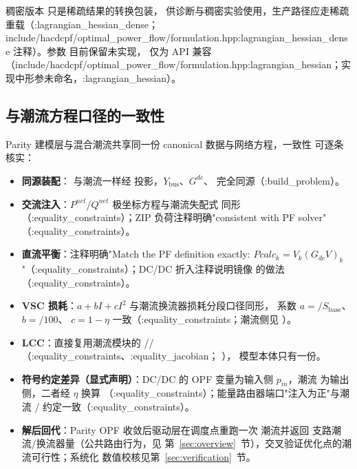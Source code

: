 稠密版本  只是稀疏结果的转换包装，
供诊断与稠密实验使用，生产路径应走稀疏重载（:lagrangian\_hessian\_dense；
include/hacdcpf/optimal\_power\_flow/formulation.hpp:lagrangian\_hessian\_dense 注释）。参数  目前保留未实现，
仅为 API 兼容（include/hacdcpf/optimal\_power\_flow/formulation.hpp:lagrangian\_hessian；实现中形参未命名，:lagrangian\_hessian）。

\subsection{与潮流方程口径的一致性}\label{subsec:parity-pf-consistency}

Parity 建模层与混合潮流共享同一份 canonical 数据与网络方程，一致性
可逐条核实：

\begin{itemize}
\item \textbf{同源装配}： 与潮流一样经
   投影，$Y_{\mathrm{bus}}$、$G^{dc}$、
   完全同源（:build\_problem）。
\item \textbf{交流注入}：$P^{net}$/$Q^{net}$ 极坐标方程与潮流失配式
  同形（:equality\_constraints）；ZIP 负荷注释明确"consistent with PF solver"
  （:equality\_constraints）。
\item \textbf{直流平衡}：注释明确"Match the PF definition exactly:
  $Pcalc_k=V_k(G_{dc}V)_k$"（:equality\_constraints）；DC/DC 折入注释说明镜像
   的做法（:equality\_constraints）。
\item \textbf{VSC 损耗}：$a+bI+cI^2$ 与潮流换流器损耗分段口径同形，
  系数 $a=$$/S_{\mathrm{base}}$、$b=$$/100$、
  $c=1-\eta$ 一致（:equality\_constraints；潮流侧见
  ）。
\item \textbf{LCC}：直接复用潮流模块的
  //
  （:equality\_constraints、:equality\_jacobian；
  ），
  模型本体只有一份。
\item \textbf{符号约定差异（显式声明）}：DC/DC 的 OPF 变量为输入侧
  $p_{in}$，潮流  为输出侧，二者经 $\eta$ 换算
  （:equality\_constraints）；能量路由器端口"注入为正"与潮流
  / 约定一致（:equality\_constraints）。
\item \textbf{解后回代}：Parity OPF 收敛后驱动层在调度点重跑一次
  潮流并返回  支路潮流/换流器量（公共路由行为，见
  第~\ref{sec:overview}~节），交叉验证优化点的潮流可行性；系统化
  数值校核见第~\ref{sec:verification}~节。
\end{itemize}

